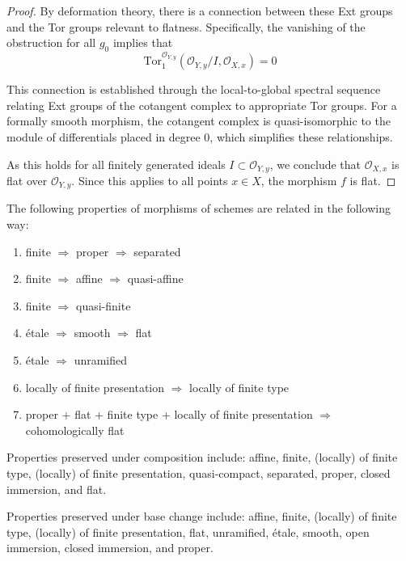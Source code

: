 \documentclass[12pt]{article}
\begin{document}
\begin{proof}
    \medskip
    \noindent By deformation theory, there is a connection between these Ext groups and the Tor groups relevant to flatness. Specifically, the vanishing of the obstruction for all $g_0$ implies that
    \begin{equation}
        \text{Tor}_1^{\mathcal{O}_{Y,y}}(\mathcal{O}_{Y,y}/I, \mathcal{O}_{X,x}) = 0
    \end{equation}

    This connection is established through the local-to-global spectral sequence relating Ext groups of the cotangent complex to appropriate Tor groups. For a formally smooth morphism, the cotangent complex is quasi-isomorphic to the module of differentials placed in degree 0, which simplifies these relationships.

    \medskip
    \noindent As this holds for all finitely generated ideals $I \subset \mathcal{O}_{Y,y}$, we conclude that $\mathcal{O}_{X,x}$ is flat over $\mathcal{O}_{Y,y}$. Since this applies to all points $x \in X$, the morphism $f$ is flat.


\end{proof}


\begin{remark}
    The following properties of morphisms of schemes are related in the following way:
    \begin{enumerate}
        \item finite $\Rightarrow$ proper $\Rightarrow$ separated
        \item finite $\Rightarrow$ affine $\Rightarrow$ quasi-affine
        \item finite $\Rightarrow$ quasi-finite
        \item étale $\Rightarrow$ smooth $\Rightarrow$ flat
        \item étale $\Rightarrow$ unramified
        \item locally of finite presentation $\Rightarrow$ locally of finite type
        \item proper + flat + finite type + locally of finite presentation $\Rightarrow$ cohomologically flat
    \end{enumerate}

    Properties preserved under composition include: affine, finite, (locally) of finite type, (locally) of finite presentation, quasi-compact, separated, proper, closed immersion, and flat.

    Properties preserved under base change include: affine, finite, (locally) of finite type, (locally) of finite presentation, flat, unramified, étale, smooth, open immersion, closed immersion, and proper.
\end{remark}
\end{document}
